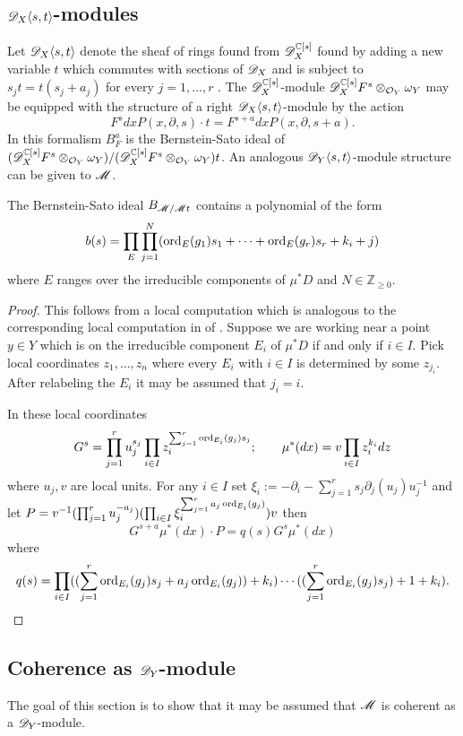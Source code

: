  \subsection{$\mathscr{D}_X\langle s, t\rangle$-modules}
 Let $\mathscr{D}_X\langle s,t \rangle$ denote the sheaf of rings found from $\mathscr{D}_X^{\mathbb{C}[s]}$ found by adding a new variable $t$ which commutes with sections of $\mathscr{D}_X$ and is subject to $s_j t = t(s_j +a_j)$ for every $j=1,\ldots, r$ .
 The $\mathscr{D}_X^{\mathbb{C}[s]}$-module $\mathscr{D}_X^{\mathbb{C}[s]} F^s\otimes_{\mathcal{O}_Y}\omega_Y$ may be equipped with the structure of a right $\mathscr{D}_X\langle s, t\rangle$-module by the action
 $$F^sdx P(x,\partial,s) \cdot t  =F^{s + a}dx P(x,\partial, s + a).$$
 In this formalism $B_F^a$ is the Bernstein-Sato ideal of $(\mathscr{D}_X^{\mathbb{C}[s]} F^s\otimes_{\mathcal{O}_Y}\omega_Y) / (\mathscr{D}_X^{\mathbb{C}[s]} F^s\otimes_{\mathcal{O}_Y}\omega_Y) t$.
 An analogous $\mathscr{D}_Y\langle s,t\rangle$-module structure can be given to $\mathscr{M}$.
 \begin{lemma}\label{lem: BernsteinSatoPolynomialUpstairs}
  The Bernstein-Sato ideal $B_{\mathscr{M}/\mathscr{M} t}$ contains a polynomial of the form
  $$b(s)=\prod_E \prod_{j=1}^N(\operatorname{ord}_{E}(g_1) s_1 + \cdots + \operatorname{ord}_{E}(g_r) s_r + k_i + j)$$
  where $E$ ranges over the irreducible components of $\mu^*D$ and $N\in \mathbb{Z}_{\geq 0}$.
 \end{lemma}
 \begin{proof}
  This follows from a local computation which is analogous to the corresponding local computation in  of .
 Suppose we are working near a point $y\in Y$ which is on the irreducible component $E_i$ of $\mu^*D$ if and only if $i\in I$.
 Pick local coordinates $z_1,\ldots,z_n$ where every $E_i$ with $i\in I$ is determined by some $z_{j_i}$.
 After relabeling the $E_i$ it may be assumed that $j_i = i$.

 In these local coordinates
 $$G^s = \prod_{j=1}^r u_j^{s_j} \prod_{i\in I} z_i^{\sum_{j=1}^r   \operatorname{ord}_{E_i}(g_j)s_j};\qquad \mu^*(dx) = v \prod_{i\in I} z_i^{k_i} dz$$
 where $u_j, v$ are local units.
 For any $i\in I$ set $\xi_i := -\partial_i - \sum_{j=1}^{r}s_j\partial_j(u_j)u_j^{-1}$ and let $P = v^{-1}(\prod_{j=1}^r u_j^{-a_j}) (\prod_{i\in I}\xi_i^{\sum_{j=1}^r a_j\operatorname{ord}_{E_i}(g_j)}) v$ then
 $$G^{s+a}\mu^*(dx) \cdot P =  q(s) G^s \mu^*(dx) $$
 where
 $$q(s) = \prod_{i\in I}((\sum_{j=1}^r \operatorname{ord}_{E_i}(g_j)s_j + a_j\operatorname{ord}_{E_i}(g_j)) + k_i)\cdots((\sum_{j=1}^r \operatorname{ord}_{E_i}(g_j)s_j) + 1 + k_i ).$$
 \end{proof}
 \subsection{Coherence as $\mathscr{D}_Y$-module}
  The goal of this section is to show that it may be assumed that $\mathscr{M}$ is coherent as a $\mathscr{D}_Y$-module.

